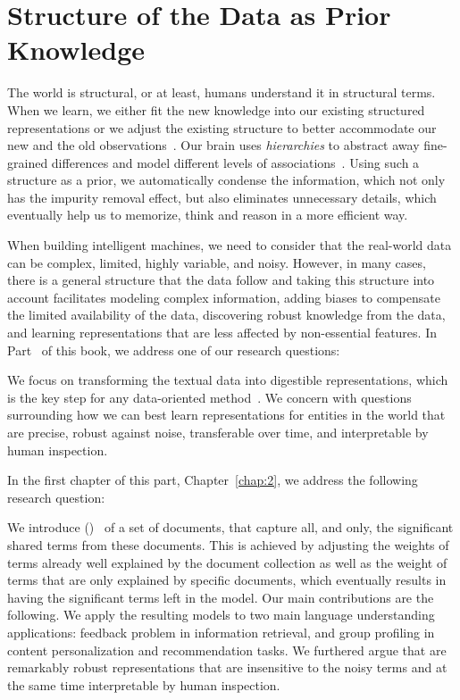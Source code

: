 \part{Structure of the Data as Prior Knowledge}
\label{part1}
%

The world is structural, or at least, humans understand it in structural terms. When we learn, we either fit the new knowledge into our existing structured representations or we adjust the existing structure to better accommodate our new and the old observations~\citep{battaglia2018relational}.
%
Our brain uses \emph{hierarchies} to abstract away fine-grained differences and model different levels of associations~\citep{Ballard:2015}. Using such a structure as a prior, we automatically condense the information, which not only has the impurity removal effect, but also eliminates unnecessary details, which eventually help us to memorize, think and reason in a more efficient way.

When building intelligent machines, we need to consider that the real-world data can be complex, limited, highly variable, and noisy. However, in many cases, there is a general structure that the data follow and taking this structure into account facilitates modeling complex information, adding biases to compensate the limited availability of the data, discovering robust knowledge from the data, and learning representations that are less affected by non-essential features. 
%
In Part~\ref{part1} of this book, we address one of our research questions:

We focus on transforming the textual data into digestible representations, which is the key step for any data-oriented method~\citep{Bengio:2013}. We concern with questions surrounding how we can best learn representations for entities in the world that are precise, robust against noise, transferable over time, and interpretable by human inspection.  

In the first chapter of this part, Chapter~\ref{chap:2}, we address the following research question:

We introduce \emph{\swlms} (\acswlm)~\citep{Dehghani:2016:SIGIR} of a set of documents, that capture all, and only, the significant shared terms from these documents.  This is achieved by adjusting the weights of terms already well explained by the document collection as well as the weight of terms that are only explained by specific documents, which eventually results in having the significant terms left in the model. 
Our main contributions are the following.
We apply the resulting models to two main language understanding applications: feedback problem in information retrieval\citep{Dehghani:CIKM2016:long, Dehghani:CIKM2016:short}, and group profiling in content personalization and recommendation tasks\citep{Dehghani:2016:CHIIR,Dehghani2016:trec}. We furthered argue that \acswlm are remarkably robust representations that are insensitive to the noisy terms and at the same time interpretable by human inspection. 

